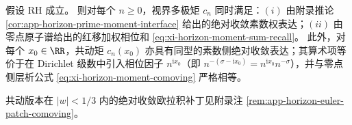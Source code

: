 \begin{corollary}\label{cor:xi-horizon-weighted-explicit-formula}
假设 RH 成立。
则对每个 \(n\ge 0\)，视界多极矩 \(c_n\) 同时满足：\((i)\) 由附录推论 \ref{cor:app-horizon-prime-moment-interface} 给出的绝对收敛素数权表达；\((ii)\) 由零点原子谱给出的红移加权相位和 \eqref{eq:xi-horizon-moment-sum-recall}。
此外，对每个 \(x_0\in\RR\)，共动矩 \(c_n(x_0)\) 亦具有同型的素数侧绝对收敛表达；其算术项等价于在 Dirichlet 级数中引入相位因子 \(n^{\mathrm{i}x_0}\)（即 \(n^{-(\sigma-\mathrm{i}x_0)}=n^{\mathrm{i}x_0}n^{-\sigma}\)），并与零点侧层析公式 \eqref{eq:xi-horizon-moment-comoving} 严格相等。
\end{corollary}
\noindent
共动版本在 \(|w|<1/3\) 内的绝对收敛欧拉积补丁见附录注 \ref{rem:app-horizon-euler-patch-comoving}。

\endinput
